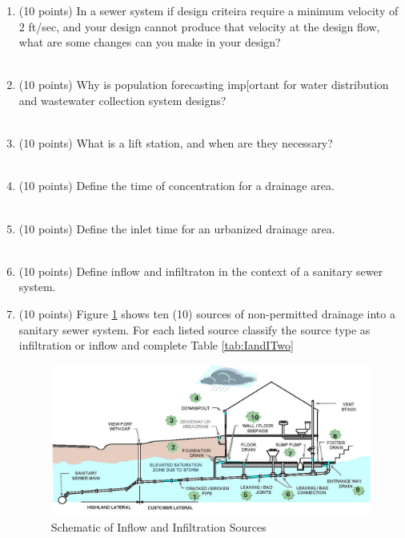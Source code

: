 \documentclass[12pt]{article}
\begin{document}
\begin{enumerate}

\item (10 points) In a sewer system if design criteira require a minimum velocity of 2 ft/sec, and your design cannot produce that velocity at the design flow, what are some changes can you make in your design? ~\\~\\ 

\item (10 points) Why is population forecasting imp[ortant for water distribution and wastewater collection system designs? ~\\~\\ 

\item (10 points) What is a lift station, and when are they necessary? ~\\~\\ 

\item (10 points) Define the time of concentration for a drainage area. ~\\~\\ 

\item (10 points) Define the inlet time for an urbanized drainage area. ~\\~\\ 

\item (10 points) Define inflow and infiltraton in the context of a sanitary sewer system.

\clearpage

\item (10 points) Figure \ref{fig:InflowInfilatration1} shows ten (10) sources of non-permitted drainage into a sanitary sewer system.
For each listed source classify the source type as infiltration or inflow and complete Table \ref{tab:IandITwo}
\begin{figure}[h!] %
\centering
   \includegraphics[width=6in]{InflowInfilatration1.jpg}
   \caption{Schematic of Inflow and Infiltration Sources}
   \label{fig:InflowInfilatration1} 
\end{figure}


\end{enumerate}
\end{document}

